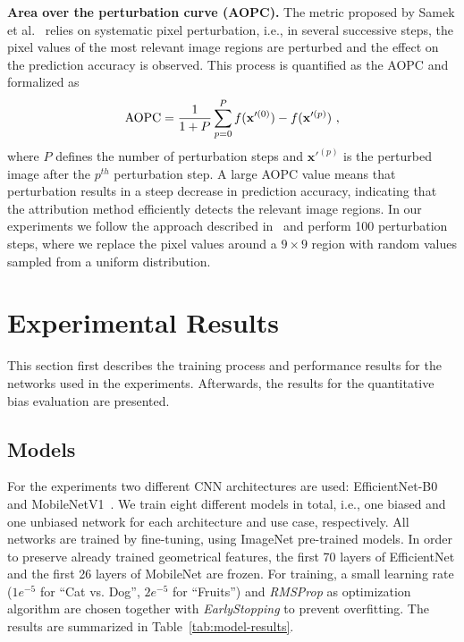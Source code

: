 \documentclass[runningheads]{llncs}
\newcommand{\Tab}[1]{Table~\ref{#1}}
\DeclareMathOperator{\aopc}{AOPC}
\begin{document}
\textbf{Area over the perturbation curve (AOPC).}
The metric proposed by Samek et al.~\cite{Samek.2017} relies on systematic pixel perturbation, i.e., in several successive steps, the pixel values of the most relevant image regions are perturbed and the effect on the prediction accuracy is observed. This process is quantified as the AOPC and formalized as
\vspace{-4mm}
\begin{equation}
    \aopc = \frac{1}{1+P} \sum_{p=0}^P f(\mathbf{x}'^{(0)}) - f(\mathbf{x}'^{(p)})~,
    \vspace{-2mm}
\end{equation}
where $P$ defines the number of perturbation steps and $\mathbf{x}'^{(p)}$ is the perturbed image after the $p^{th}$ perturbation step. A large AOPC value means that perturbation results in a steep decrease in prediction accuracy, indicating that the attribution method efficiently detects the relevant image regions. In our experiments we follow the approach described in~\cite{Samek.2017} and perform 100 perturbation steps, where we replace the pixel values around a $9 \times 9$ region with random values sampled from a uniform distribution.



\section{Experimental Results}
This section first describes the training process and performance results for the networks used in the experiments. Afterwards, the results for the quantitative bias evaluation are presented.

\subsection{Models}

For the experiments two different CNN architectures are used: EfficientNet-B0~\cite{Tan.2019} and  MobileNetV1~\cite{Howard.17.04.2017}. We train eight different models in total, i.e., one biased and one unbiased network for each architecture and use case, respectively. All networks are trained by fine-tuning, using ImageNet pre-trained models. In order to preserve already trained geometrical features, the first 70 layers of  EfficientNet and the first 26 layers of MobileNet are frozen. For training, a small learning rate ($1e^{-5}$ for \enquote{Cat vs. Dog}, $2e^{-5}$ for  \enquote{Fruits}) and \emph{RMSProp} as optimization algorithm are chosen together with \emph{EarlyStopping} to prevent overfitting. The results are summarized in \Tab{tab:model-results}.
\end{document}
